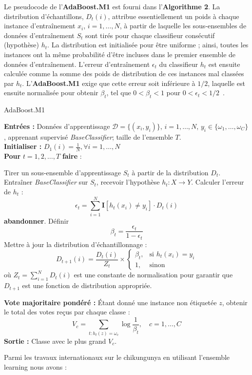 Le pseudocode de l'\textbf{AdaBoost.M1} est fourni dans l'\textbf{Algorithme 2}. La distribution d'échantillons, $D_t(i)$, attribue essentiellement un poids à chaque instance d'entraînement $x_i$, $i = 1, \dots, N$, à partir de laquelle les sous-ensembles de données d'entraînement $S_t$ sont tirés pour chaque classifieur consécutif (hypothèse) $h_t$. La distribution est initialisée pour être uniforme ; ainsi, toutes les instances ont la même probabilité d'être incluses dans le premier ensemble de données d'entraînement. L'erreur d'entraînement $\epsilon_t$ du classifieur $h_t$ est ensuite calculée comme la somme des poids de distribution de ces instances mal classées par $h_t$. L'\textbf{AdaBoost.M1} exige que cette erreur soit inférieure à $1/2$, laquelle est ensuite normalisée pour obtenir $\beta_t$, tel que $0 < \beta_t < 1$ pour $0 < \epsilon_t < 1/2$~\cite{polikar2012ensemble}.
\begin{algorithm}
	\caption{AdaBoost.M1}
	\textbf{Entrées :} Données d'apprentissage $\mathcal{D} = \{(x_i, y_i)\}$, $i = 1, \dots, N$, $y_i \in \{\omega_1, \dots, \omega_C\}$, apprenant supervisé \textit{BaseClassifier}; taille de l'ensemble $T$. \\
	\textbf{Initialiser :} $D_1(i) = \frac{1}{N}, \forall i = 1, \dots, N$ \\
	\textbf{Pour} $t = 1, 2, \dots, T$ \textbf{faire} : \\
	\begin{algorithmic}[1]
		\State Tirer un sous-ensemble d'apprentissage $S_t$ à partir de la distribution $D_t$.
		\State Entraîner \textit{BaseClassifier} sur $S_t$, recevoir l'hypothèse $h_t: X \rightarrow Y$.
		\State Calculer l'erreur de $h_t$ :
		\[
		\epsilon_t = \sum_{i=1}^{N} \mathbf{I}[h_t(x_i) \neq y_i] \cdot D_t(i)
		\]
		\State \textbf{abandonner}.
		\EndIf
		\State Définir 
		\[
		\beta_t = \frac{\epsilon_t}{1 - \epsilon_t}
		\]
		\State Mettre à jour la distribution d'échantillonnage :
		\[
		D_{t+1}(i) = \frac{D_t(i)}{Z_t} \times 
		\begin{cases}
			\beta_t, & \text{si } h_t(x_i) = y_i \\
			1, & \text{sinon}
		\end{cases}
		\]
		où $Z_t = \sum_{i=1}^{N} D_t(i)$ est une constante de normalisation pour garantir que $D_{t+1}$ est une fonction de distribution appropriée.
		
		\State \textbf{Vote majoritaire pondéré :} Étant donné une instance non étiquetée $z$, obtenir le total des votes reçus par chaque classe :
		\[
		V_c = \sum_{t: h_t(z)=\omega_c} \log \frac{1}{\beta_t}, \quad c = 1, \dots, C
		\]
		\textbf{Sortie :} Classe avec le plus grand $V_c$.
	\end{algorithmic}
\end{algorithm}
\newline
Parmi les travaux internationaux sur le chikungunya en utilisant l'ensemble learning nous avons : 

